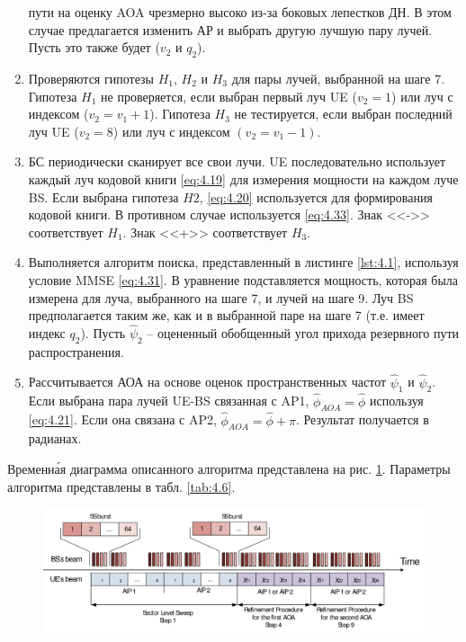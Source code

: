 \begin{enumerate}[label=\textbf{Шаг \arabic*:}]
          пути на оценку AOA чрезмерно высоко из-за боковых лепестков ДН.
          В этом случае предлагается изменить АР и выбрать
          другую лучшую пару лучей.  Пусть это также будет ($v_2$ и $q_2$).
    \item Проверяются гипотезы $H_1$, $H_2$ и $H_3$ для пары лучей, выбранной
          на шаге 7. Гипотеза $H_1$ не проверяется, если выбран первый луч UE ($v_2
              = 1$) или луч с индексом ($v_2 = v_1+1$). Гипотеза $H_3$ не тестируется,
          если выбран последний луч UE ($v_2 = 8$) или луч с индексом
          $(v_2 = v_1-1)$.
    \item БС периодически сканирует все свои лучи. UE последовательно использует
          каждый луч кодовой книги \eqref{eq:4.19} для измерения мощности на каждом
          луче BS. Если выбрана гипотеза $H2$, \eqref{eq:4.20} используется для
          формирования кодовой книги.  В противном случае используется
          \eqref{eq:4.33}.  Знак <<->> соответствует $H_1$. Знак <<+>> соответствует
          $H_3$.
    \item Выполняется алгоритм поиска, представленный в листинге \ref{lst:4.1},
          используя условие MMSE \eqref{eq:4.31}. В уравнение подставляется мощность,
          которая была измерена для луча, выбранного на шаге 7, и лучей на шаге 9. Луч BS
          предполагается таким же, как и в выбранной паре на шаге 7 (т.е. имеет индекс
          $q_2$). Пусть $\hat \psi_2$ -- оцененный обобщенный угол прихода резервного пути распространения.
    \item Рассчитывается АОА на основе оценок пространственных частот $\hat \psi_1$ и
          $\hat \psi_2$. Если выбрана пара лучей UE-BS связанная с AP1, $\hat \phi_{AOA}=\hat \phi$
          используя \eqref{eq:4.21}.
          Если она связана с AP2, $\hat \phi_{AOA} = \hat\phi + \pi$. Результат
          получается в радианах.
\end{enumerate}

Временн\'{а}я диаграмма описанного алгоритма представлена на рис. \ref{fig:4.25}.
Параметры алгоритма представлены в табл. \ref{tab:4.6}.

\begin{figure}[h!]
    \centering
    \includegraphics[width=\linewidth]{figs/fig4.25}
    \caption{}
    \label{fig:4.25}
\end{figure}

